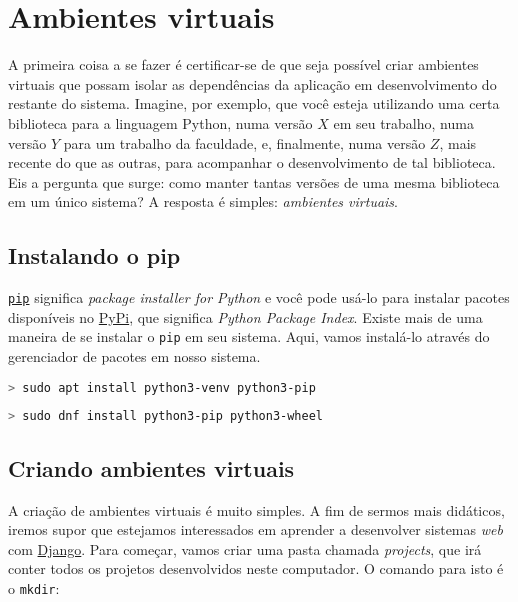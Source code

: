 \section{Ambientes virtuais}\label{sec:ambientes-virtuais}

A primeira coisa a se fazer é certificar-se de que seja possível criar ambientes
virtuais que possam isolar as dependências da aplicação em desenvolvimento do
restante do sistema. Imagine, por exemplo, que você esteja utilizando uma certa
biblioteca para a linguagem Python, numa versão \(X\) em seu trabalho, numa
versão \(Y\) para um trabalho da faculdade, e, finalmente, numa versão \(Z\),
mais recente do que as outras, para acompanhar o desenvolvimento de tal
biblioteca. Eis a pergunta que surge: como manter tantas versões de uma mesma
biblioteca em um único sistema? A resposta é simples: \textit{ambientes
virtuais}.

\subsection{Instalando o pip}\label{ssec:instalando-o-pip}

\href{https://pypi.org/project/pip/}{\texttt{pip}} significa \textit{package
installer for Python} e você pode usá-lo para instalar pacotes disponíveis no
\href{https://pypi.org/}{PyPi}, que significa \textit{Python Package Index}.
Existe mais de uma maneira de se instalar o \texttt{pip} em seu sistema. Aqui,
vamos instalá-lo através do gerenciador de pacotes em nosso sistema.

\begin{lstlisting}[language=bash,caption={Instalando o \texttt{pip} no Debian}]
  > sudo apt install python3-venv python3-pip
\end{lstlisting}

\begin{lstlisting}[language=bash,caption={Instalando o \texttt{pip} no Fedora}]
  > sudo dnf install python3-pip python3-wheel
\end{lstlisting}

\subsection{Criando ambientes virtuais}\label{ssec:criando-ambientes-virtuais}

A criação de ambientes virtuais é muito simples. A fim de sermos mais didáticos,
iremos supor que estejamos interessados em aprender a desenvolver sistemas
\textit{web} com \href{https://www.djangoproject.com/}{Django}. Para começar,
vamos criar uma pasta chamada \textit{projects}, que irá conter todos os
projetos desenvolvidos neste computador. O comando para isto é o \texttt{mkdir}:

